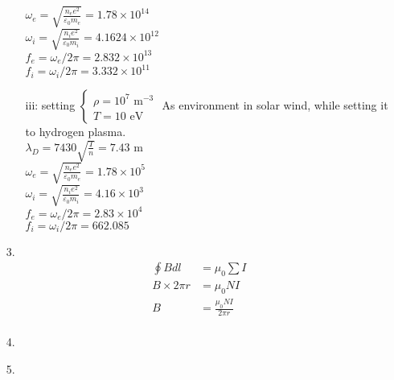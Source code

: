 \documentclass{article}
\begin{document}
\begin{itemize}
\begin{itemize}
            \(\omega_e = \sqrt{\frac{n_ee^2}{\varepsilon_0m_e}} = 1.78\times 10^{14}\)\\
            \(\omega_i = \sqrt{\frac{n_ie^2}{\varepsilon_0m_i}} = 4.1624\times 10^{12}\)\\
            \(f_e  =\omega_e /2\pi = 2.832\times 10^{13}\)\\
            \(f_i  =\omega_i /2\pi = 3.332\times 10^{11}\)
            \item [iii:] setting \(\left\{\begin{matrix}
                \rho = 10^{7} \text{ m}^{-3}\\
                T    = 10 \text{ eV}
            \end{matrix}\right.\) As environment in solar wind, while setting it to hydrogen plasma.\\
            \(\lambda_D = 7430\sqrt{\frac{T}{n}} = 7.43 \text{ m}\)\\
            \(\omega_e = \sqrt{\frac{n_ee^2}{\varepsilon_0m_e}} = 1.78\times 10^{5}\)\\
            \(\omega_i = \sqrt{\frac{n_ie^2}{\varepsilon_0m_i}} = 4.16\times 10^{3}\)\\
            \(f_e  =\omega_e /2\pi = 2.83\times 10^{4}\)\\
            \(f_i  =\omega_i /2\pi = 662.085\)
        \end{itemize}
    \item [3.]
    \begin{align*}
        \oint B dl &= \mu_0 \sum I\\
        B\times 2\pi r &= \mu_0 N I\\
        B &= \frac{\mu_0 N I}{ 2\pi r}\\
    \end{align*}
    \item [4.]
    \item [5.]\
\end{itemize}
\end{document}
